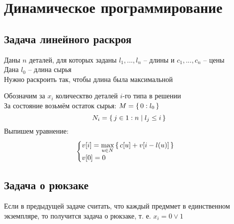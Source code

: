 \section{Динамическое программирование}

\subsection{Задача линейного раскроя}

\begin{problem}
	Даны $ n $ деталей, для которых заданы $ l_1, ..., l_n $ -- длины и $ c_1, ..., c_n $ -- цены \\
    Дана $ l_0 $ -- длина сырья \\
    Нужно раскроить так, чтобы длина была максимальной
\end{problem}

Обозначим за $ x_i $ колическтво деталей $ i $-го типа в решении \\
За состояние возьмём остаток сырья: $ M = \set{0 : l_0} $
$$ N_i = \set{j \in 1 : n | l_j \le i} $$
Выпишем уравнение:
$$
\begin{cases}
    v[i] = \max\limits_{u \in N}\set{c[u] + v[i - l(u)]} \\
    v[0] = 0
\end{cases} $$

\subsection{Задача о рюкзаке}

Если в предыдущей задаче считать, что каждый предммет в единственном экземпляре, то получится задача о рюкзаке, т. е. $ x_i = 0 \vee 1 $
